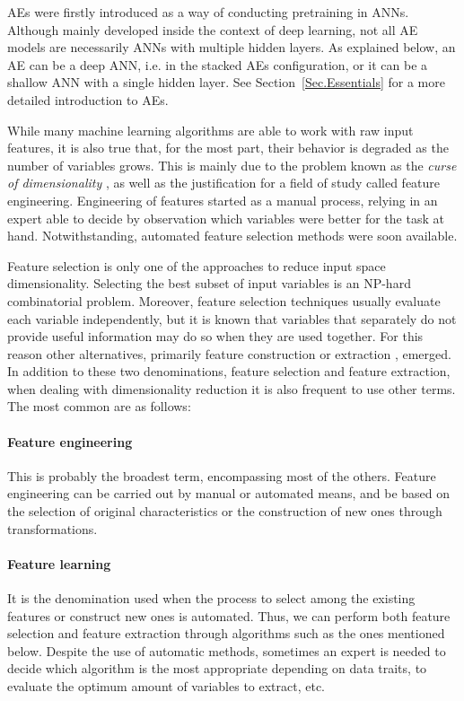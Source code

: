 AEs were firstly introduced \cite{AEs} as a way of conducting pretraining in ANNs. Although mainly developed inside the context of deep learning, not all AE models are necessarily ANNs with multiple hidden layers. As explained below, an AE can be a deep ANN, i.e. in the stacked AEs configuration, or it can be a shallow ANN with a single hidden layer. See Section~\ref{Sec.Essentials} for a more detailed introduction to AEs.

While many machine learning algorithms are able to work with raw input features, it is also true that, for the most part, their behavior is degraded as the number of variables grows. This is mainly due to the problem known as the \textit{curse of dimensionality} \cite{Richard1957}, as well as the justification for a field of study called feature engineering. Engineering of features started as a manual process, relying in an expert able to decide by observation which variables were better for the task at hand. Notwithstanding, automated feature selection \cite{FeatureSelection} methods were soon available.

Feature selection is only one of the approaches to reduce input space dimensionality. Selecting the best subset of input variables is an NP-hard combinatorial problem. Moreover, feature selection techniques usually evaluate each variable independently, but it is known that variables that separately do not provide useful information may do so when they are used together. For this reason other alternatives, primarily feature construction or extraction \cite{FeatureExtraction}, emerged. In addition to these two denominations, feature selection and feature extraction, when dealing with dimensionality reduction it is also frequent to use other terms. The most common are as follows:

	\paragraph{Feature engineering \cite{Domingos2012AFU}}
	This is probably the broadest term, encompassing most of the others. Feature engineering can be carried out by manual or automated means, and be based on the selection of original characteristics or the construction of new ones through transformations. 

	\paragraph{Feature learning \cite{bengio_representation_2013}}
	It is the denomination used when the process to select among the existing features or construct new ones is automated. Thus, we can perform both feature selection and feature extraction through algorithms such as the ones mentioned below. Despite the use of automatic methods, sometimes an expert is needed to decide which algorithm is the most appropriate depending on data traits, to evaluate the optimum amount of variables to extract, etc.
	

